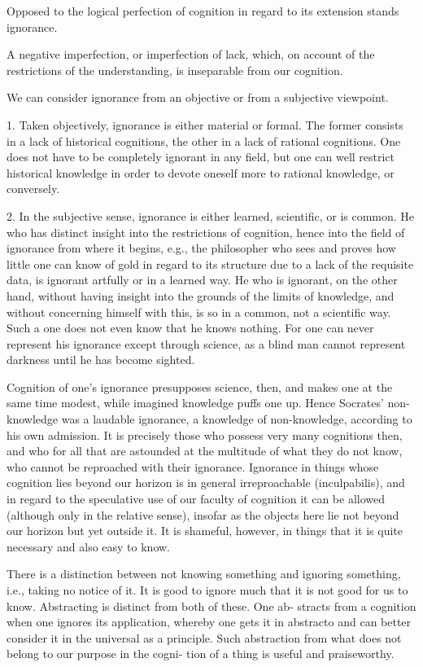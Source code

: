 Opposed to the logical perfection of cognition
in regard to its extension stands ignorance.

A negative imperfection, or imperfection of lack, which,
on account of the restrictions of the understanding,
is inseparable from our cognition.

We can consider ignorance from an objective or from a subjective viewpoint.

1. Taken objectively, ignorance is either material or formal.
The former consists in a lack of historical cognitions,
the other in a lack of rational cognitions.
One does not have to be completely ignorant in any field,
but one can well restrict historical knowledge in order to
devote oneself more to rational knowledge, or conversely.

2. In the subjective sense, ignorance is either learned, scientific, or is common.
He who has distinct insight into the restrictions of cognition,
hence into the field of ignorance from where it begins,
e.g., the philosopher who sees and proves how little one can know of
gold in regard to its structure due to a lack of the requisite data,
is ignorant artfully or in a learned way.
He who is ignorant, on the other hand, without
having insight into the grounds of the limits of knowledge,
and without concerning himself with this, is so in a common, not a scientific way.
Such a one does not even know that he knows nothing.
For one can never represent his ignorance except through science,
as a blind man cannot represent darkness until he has become sighted.

Cognition of one's ignorance presupposes science, then, and
makes one at the same time modest, while imagined knowledge puffs one up.
Hence Socrates' non-knowledge was a laudable ignorance,
a knowledge of non-knowledge, according to his own admission.
It is precisely those who possess very many cognitions then, and
who for all that are astounded at the multitude of what they do not know,
who cannot be reproached with their ignorance.
Ignorance in things whose cognition lies beyond our horizon is in
general irreproachable (inculpabilis), and in regard to the speculative use of
our faculty of cognition it can be allowed (although only in the relative
sense), insofar as the objects here lie not beyond our horizon but yet outside
it. It is shameful, however, in things that it is quite necessary and also easy
to know.

There is a distinction between not knowing something and ignoring
something, i.e., taking no notice of it. It is good to ignore much that it is not
good for us to know. Abstracting is distinct from both of these. One ab-
stracts from a cognition when one ignores its application, whereby one
gets it in abstracto and can better consider it in the universal as a principle.
Such abstraction from what does not belong to our purpose in the cogni-
tion of a thing is useful and praiseworthy.

